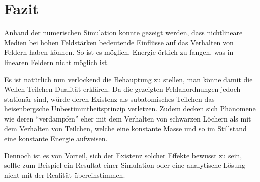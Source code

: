 %
%
%
%
\section{Fazit\label{particles:section:fazit}}

Anhand der numerischen Simulation konnte gezeigt werden, dass nichtlineare Medien bei hohen Feldstärken bedeutende Einflüsse auf das Verhalten von Feldern haben können.
So ist es möglich, Energie örtlich zu fangen, was in linearen Feldern nicht möglich ist.

Es ist natürlich nun verlockend die Behauptung zu stellen, man könne damit die Wellen-Teilchen-Dualität erklären.
Da die gezeigten Feldanordnungen jedoch stationär sind, würde deren Existenz als subatomisches Teilchen das heisenbergsche Unbestimmtheitsprinzip verletzen.
Zudem decken sich Phänomene wie deren ``verdampfen'' eher mit dem Verhalten von schwarzen Löchern als mit dem Verhalten von Teilchen, welche eine konstante Masse und so im Stillstand eine konstante Energie aufweisen.

Dennoch ist es von Vorteil, sich der Existenz solcher Effekte bewusst zu sein, sollte zum Beispiel ein Resultat einer Simulation oder eine analytische Lösung nicht mit der Realität übereinstimmen.


